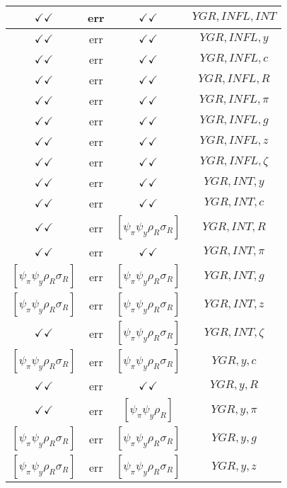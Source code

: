 \documentclass[a4paper,10pt]{article}
\begin{document}
\begin{longtable}{|c|c|c|c|}
\hline
$\checkmark\checkmark$ & err & $\checkmark\checkmark$ & ${YGR},{INFL},{INT}$ \\
\hline
$\checkmark\checkmark$ & err & $\checkmark\checkmark$ & ${YGR},{INFL},{y}$ \\
\hline
$\checkmark\checkmark$ & err & $\checkmark\checkmark$ & ${YGR},{INFL},{c}$ \\
\hline
$\checkmark\checkmark$ & err & $\checkmark\checkmark$ & ${YGR},{INFL},{R}$ \\
\hline
$\checkmark\checkmark$ & err & $\checkmark\checkmark$ & ${YGR},{INFL},{\pi}$ \\
\hline
$\checkmark\checkmark$ & err & $\checkmark\checkmark$ & ${YGR},{INFL},{g}$ \\
\hline
$\checkmark\checkmark$ & err & $\checkmark\checkmark$ & ${YGR},{INFL},{z}$ \\
\hline
$\checkmark\checkmark$ & err & $\checkmark\checkmark$ & ${YGR},{INFL},{\zeta}$ \\
\hline
$\checkmark\checkmark$ & err & $\checkmark\checkmark$ & ${YGR},{INT},{y}$ \\
\hline
$\checkmark\checkmark$ & err & $\checkmark\checkmark$ & ${YGR},{INT},{c}$ \\
\hline
$\checkmark\checkmark$ & err & $[\psi_\pi \psi_y \rho_R \sigma_R ]$ & ${YGR},{INT},{R}$ \\
\hline
$\checkmark\checkmark$ & err & $\checkmark\checkmark$ & ${YGR},{INT},{\pi}$ \\
\hline
$[\psi_\pi \psi_y \rho_R \sigma_R ]$ & err & $[\psi_\pi \psi_y \rho_R \sigma_R ]$ & ${YGR},{INT},{g}$ \\
\hline
$[\psi_\pi \psi_y \rho_R \sigma_R ]$ & err & $[\psi_\pi \psi_y \rho_R \sigma_R ]$ & ${YGR},{INT},{z}$ \\
\hline
$\checkmark\checkmark$ & err & $[\psi_\pi \psi_y \rho_R \sigma_R ]$ & ${YGR},{INT},{\zeta}$ \\
\hline
$[\psi_\pi \psi_y \rho_R \sigma_R ]$ & err & $[\psi_\pi \psi_y \rho_R \sigma_R ]$ & ${YGR},{y},{c}$ \\
\hline
$\checkmark\checkmark$ & err & $\checkmark\checkmark$ & ${YGR},{y},{R}$ \\
\hline
$\checkmark\checkmark$ & err & $[\psi_\pi \psi_y \rho_R ]$ & ${YGR},{y},{\pi}$ \\
\hline
$[\psi_\pi \psi_y \rho_R \sigma_R ]$ & err & $[\psi_\pi \psi_y \rho_R \sigma_R ]$ & ${YGR},{y},{g}$ \\
\hline
$[\psi_\pi \psi_y \rho_R \sigma_R ]$ & err & $[\psi_\pi \psi_y \rho_R \sigma_R ]$ & ${YGR},{y},{z}$ \\

\end{longtable}
\end{document}

